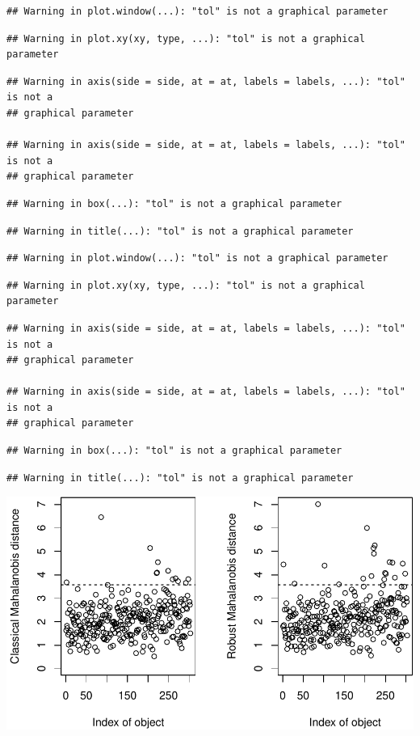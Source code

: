 \documentclass[]{article}
\begin{document}
\begin{verbatim}
## Warning in plot.window(...): "tol" is not a graphical parameter
\end{verbatim}

\begin{verbatim}
## Warning in plot.xy(xy, type, ...): "tol" is not a graphical parameter
\end{verbatim}

\begin{verbatim}
## Warning in axis(side = side, at = at, labels = labels, ...): "tol" is not a
## graphical parameter

## Warning in axis(side = side, at = at, labels = labels, ...): "tol" is not a
## graphical parameter
\end{verbatim}

\begin{verbatim}
## Warning in box(...): "tol" is not a graphical parameter
\end{verbatim}

\begin{verbatim}
## Warning in title(...): "tol" is not a graphical parameter
\end{verbatim}

\begin{verbatim}
## Warning in plot.window(...): "tol" is not a graphical parameter
\end{verbatim}

\begin{verbatim}
## Warning in plot.xy(xy, type, ...): "tol" is not a graphical parameter
\end{verbatim}

\begin{verbatim}
## Warning in axis(side = side, at = at, labels = labels, ...): "tol" is not a
## graphical parameter

## Warning in axis(side = side, at = at, labels = labels, ...): "tol" is not a
## graphical parameter
\end{verbatim}

\begin{verbatim}
## Warning in box(...): "tol" is not a graphical parameter
\end{verbatim}

\begin{verbatim}
## Warning in title(...): "tol" is not a graphical parameter
\end{verbatim}

\includegraphics{project_report_files/figure-latex/unnamed-chunk-4-1.pdf}
\end{document}
